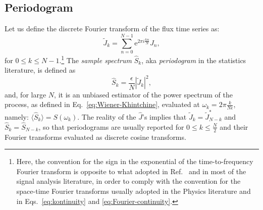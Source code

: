 \subsection{Periodogram}
Let us define the discrete Fourier transform of the flux time series as:
\begin{equation}
  \tilde{J}_{k}=\sum_{n=0}^{N-1} \mathrm{e}^{ 2\pi i\frac{kn}{N}} J_n, \label{eq:Jk}
\end{equation}
for $0 \leq k \leq N-1$.\footnote{Here, the convention for the sign in the exponential of the time-to-frequency Fourier transform is opposite to what adopted in Ref.~\cite{Ercole2017} and in most of the signal analysis literature, in order to comply with the convention for the space-time Fourier transforms usually adopted in the Physics literature and in Eqs.~\eqref{eq:kontinuity} and \eqref{eq:Fourier-continuity}.}
The \emph{sample spectrum} $\hat S_k$, aka \emph{periodogram} in the statistics literature, is defined as
\begin{equation}
\hat{S}_{k}=\frac{\epsilon}{N} \left |\tilde{J}_{k} \right |^2, \label{eq:periodogram-def}
\end{equation}
and, for large $N$, it is an unbiased estimator of the power spectrum of the process, as defined in Eq.~\eqref{eq:Wiener-Khintchine}, evaluated at $\omega_k=2\pi\frac{k}{N\epsilon}$, namely: $\langle \hat S_k \rangle = S(\omega_k)$. The reality of the $\hat J$'s implies that $\tilde J_k=\tilde J^*_{N-k}$ and $\hat S_k=\hat S_{N-k}$, so that periodograms are usually reported for $0\leq k\leq \frac{N}{2}$ and their Fourier transforms evaluated as discrete cosine transforms.

